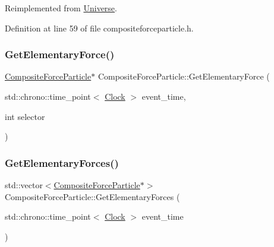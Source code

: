 Reimplemented from \mbox{\hyperlink{class_universe_a9f099605c082e7fa755787a6a8cab7ba}{Universe}}.



Definition at line 59 of file compositeforceparticle.\+h.

\mbox{\label{class_composite_force_particle_a63b3daf44517c90bb805b6612dd26acc}} 
\subsubsection{\texorpdfstring{Get\+Elementary\+Force()}{GetElementaryForce()}}
{\footnotesize\ttfamily \mbox{\hyperlink{class_composite_force_particle}{Composite\+Force\+Particle}}$\ast$ Composite\+Force\+Particle\+::\+Get\+Elementary\+Force (\begin{DoxyParamCaption}\item[{std\+::chrono\+::time\+\_\+point$<$ \mbox{\hyperlink{universe_8h_a0ef8d951d1ca5ab3cfaf7ab4c7a6fd80}{Clock}} $>$}]{event\+\_\+time,  }\item[{int}]{selector }\end{DoxyParamCaption})}

\mbox{\label{class_composite_force_particle_a2e9da0590067cf243c0f2d239f712e7f}} 
\subsubsection{\texorpdfstring{Get\+Elementary\+Forces()}{GetElementaryForces()}}
{\footnotesize\ttfamily std\+::vector$<$\mbox{\hyperlink{class_composite_force_particle}{Composite\+Force\+Particle}}$\ast$$>$ Composite\+Force\+Particle\+::\+Get\+Elementary\+Forces (\begin{DoxyParamCaption}\item[{std\+::chrono\+::time\+\_\+point$<$ \mbox{\hyperlink{universe_8h_a0ef8d951d1ca5ab3cfaf7ab4c7a6fd80}{Clock}} $>$}]{event\+\_\+time }\end{DoxyParamCaption})}

